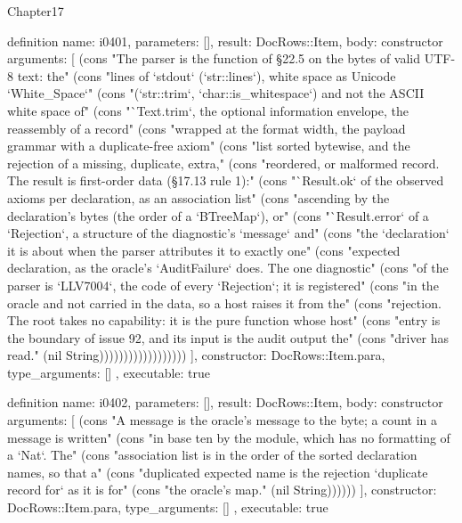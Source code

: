 \begin{lexlean}{Chapter17}
\begin{semanticmodule}
definition{
  name: i0401,
  parameters: [],
  result: DocRows::Item,
  body: constructor{
    arguments: [
      (cons "The parser is the function of §22.5 on the bytes of valid UTF-8 text: the" (cons "lines of `stdout` (`str::lines`), white space as Unicode `White_Space`" (cons "(`str::trim`, `char::is_whitespace`) and not the ASCII white space of" (cons "`Text.trim`, the optional information envelope, the reassembly of a record" (cons "wrapped at the format width, the payload grammar with a duplicate-free axiom" (cons "list sorted bytewise, and the rejection of a missing, duplicate, extra," (cons "reordered, or malformed record. The result is first-order data (§17.13 rule 1):" (cons "`Result.ok` of the observed axioms per declaration, as an association list" (cons "ascending by the declaration's bytes (the order of a `BTreeMap`), or" (cons "`Result.error` of a `Rejection`, a structure of the diagnostic's `message` and" (cons "the `declaration` it is about when the parser attributes it to exactly one" (cons "expected declaration, as the oracle's `AuditFailure` does. The one diagnostic" (cons "of the parser is `LLV7004`, the code of every `Rejection`; it is registered" (cons "in the oracle and not carried in the data, so a host raises it from the" (cons "rejection. The root takes no capability: it is the pure function whose host" (cons "entry is the boundary of issue 92, and its input is the audit output the" (cons "driver has read." (nil String))))))))))))))))))
    ],
    constructor: DocRows::Item.para,
    type_arguments: []
  },
  executable: true
}

definition{
  name: i0402,
  parameters: [],
  result: DocRows::Item,
  body: constructor{
    arguments: [
      (cons "A message is the oracle's message to the byte; a count in a message is written" (cons "in base ten by the module, which has no formatting of a `Nat`. The" (cons "association list is in the order of the sorted declaration names, so that a" (cons "duplicated expected name is the rejection `duplicate record for` as it is for" (cons "the oracle's map." (nil String))))))
    ],
    constructor: DocRows::Item.para,
    type_arguments: []
  },
  executable: true
}


\end{semanticmodule}
\end{lexlean}
